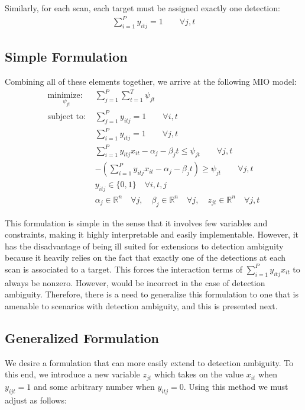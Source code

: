 Similarly, for each scan, each target must be assigned exactly one detection:
\begin{align}
\sum_{i=1}^{P} y_{itj} = 1 \qquad \forall j,t
\end{align}

\subsection{Simple Formulation}
Combining all of these elements together, we arrive at the following MIO model:
\begin{align*}
\underset{\psi_{jt}}{\text{minimize: }} & \sum_{j=1}^{P} \sum_{t=1}^{T} \psi_{jt} \\
\text{subject to: }	& \sum_{j=1}^{P} y_{itj} = 1 \qquad \forall i,t\\
				& \sum_{i=1}^{P} y_{itj} = 1 \qquad \forall j,t\\
				& \sum_{i=1}^{P}y_{itj}x_{it} - \alpha_{j} - \beta_{j}t \leq \psi_{jt} \qquad \forall j,t\\
				& -\left(\sum_{i=1}^{P}y_{itj}x_{it} - \alpha_{j} - \beta_{j}t\right) \geq \psi_{jt} \qquad \forall j,t\\
			 	& y_{itj} \in \{0,1\} \quad \forall i,t,j\\
				& \alpha_{j} \in \mathbb{R}^n \quad \forall j,\quad \beta_{j} \in \mathbb{R}^n \quad \forall j, \quad z_{jt} \in \mathbb{R}^n \quad \forall j,t
\end{align*}

This formulation is simple in the sense that it involves few variables and constraints, making it highly interpretable and easily implementable. However, it has the disadvantage of being ill suited for extensions to detection ambiguity because it heavily relies on the fact that exactly one of the detections at each scan is associated to a target. This forces the interaction terms of $\sum_{i=1}^{P}y_{itj}x_{it}$ to always be nonzero. However, would be incorrect in the case of detection ambiguity. Therefore, there is a need to generalize this formulation to one that is amenable to scenarios with detection ambiguity, and this is presented next.

\subsection{Generalized Formulation}
We desire a formulation that can more easily extend to detection ambiguity. To this end, we introduce a new variable $z_{jt}$ which takes on the value $x_{it}$ when $y_{ijt}=1$ and some arbitrary number when $y_{itj}=0$. Using this method we must adjust \label{eq:simple_objective} as follows:

